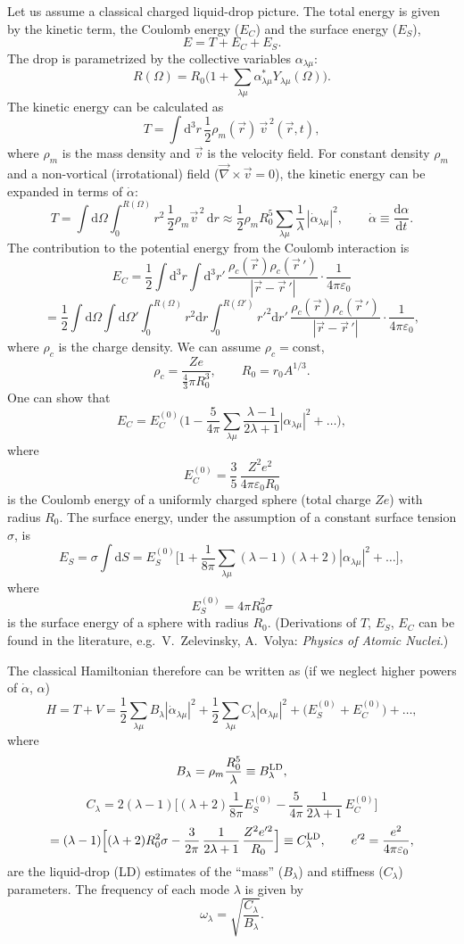 \documentclass[11pt,a4paper]{article}
\newcommand{\ud}{\mathrm{d}}
\begin{document}
Let us assume a classical charged liquid-drop picture. The total energy is given by the kinetic term, the Coulomb energy ($E_C$) and the surface energy ($E_S$),
\[
E=T+E_C+E_S .
\]
The drop is parametrized by the collective variables $\alpha_{\lambda\mu}$:
\[
R(\Omega)=R_0\Big(1+\sum_{\lambda\mu}\alpha^*_{\lambda\mu}Y_{\lambda\mu}(\Omega)\Big).
\]
The kinetic energy can be calculated as
\[
T=\int\ud^3r\,\frac12\rho_m(\vec r)\,\vec v^{\,2}(\vec r,t),
\]
where $\rho_m$ is the mass density and $\vec v$ is the velocity field. For constant density $\rho_m$ and a non-vortical (irrotational) field ($\vec\nabla\times\vec v=0$), the kinetic energy can be expanded in terms of $\dot\alpha$:
\[
T=\int\ud\Omega\int_0^{R(\Omega)}r^2\,\frac12\rho_m\vec v^{\,2}\,\ud r\approx\frac12\rho_mR_0^5\sum_{\lambda\mu}\frac1\lambda\,|\dot\alpha_{\lambda\mu}|^2,
\qquad \dot\alpha\equiv\frac{\ud\alpha}{\ud t}.
\]
The contribution to the potential energy from the Coulomb interaction is
\[
E_C=\frac12\int\ud^3r\int\ud^3r'\,\frac{\rho_c(\vec r)\rho_c(\vec r\,')}{|\vec r-\vec r\,'|}\cdot\frac{1}{4\pi\varepsilon_0}
\]
\[
=\frac12\int\ud\Omega\int\ud\Omega'\int_0^{R(\Omega)}r^2\ud r\int_0^{R(\Omega')}r'^2\ud r'\,\frac{\rho_c(\vec r)\rho_c(\vec r\,')}{|\vec r-\vec r\,'|}\cdot\frac{1}{4\pi\varepsilon_0},
\]
where $\rho_c$ is the charge density. We can assume $\rho_c=\text{const}$,
\[
\rho_c=\frac{Ze}{\frac43\pi R_0^3},\qquad R_0=r_0A^{1/3}.
\]
One can show that
\[
E_C=E_C^{(0)}\Big(1-\frac{5}{4\pi}\sum_{\lambda\mu}\frac{\lambda-1}{2\lambda+1}|\alpha_{\lambda\mu}|^2+\dots\Big),
\]
where
\[
E_C^{(0)}=\frac35\,\frac{Z^2e^2}{4\pi\varepsilon_0R_0}
\]
is the Coulomb energy of a uniformly charged sphere (total charge $Ze$) with radius $R_0$.
The surface energy, under the assumption of a constant surface tension $\sigma$, is
\[
E_S=\sigma\int\ud S=E_S^{(0)}\Big[1+\frac{1}{8\pi}\sum_{\lambda\mu}(\lambda-1)(\lambda+2)|\alpha_{\lambda\mu}|^2+\dots\Big],
\]
where
\[
E_S^{(0)}=4\pi R_0^2\sigma
\]
is the surface energy of a sphere with radius $R_0$. (Derivations of $T$, $E_S$, $E_C$ can be found in the literature, e.g.\ V.~Zelevinsky, A.~Volya: \emph{Physics of Atomic Nuclei}.)

The classical Hamiltonian therefore can be written as (if we neglect higher powers of $\dot\alpha$, $\alpha$)
\[
H=T+V=\frac12\sum_{\lambda\mu}B_\lambda|\dot\alpha_{\lambda\mu}|^2+\frac12\sum_{\lambda\mu}C_\lambda|\alpha_{\lambda\mu}|^2+\big(E_S^{(0)}+E_C^{(0)}\big)+\dots,
\]
where
\[
B_\lambda=\rho_m\frac{R_0^5}{\lambda}\equiv B_\lambda^{\rm LD},
\]
\[
C_\lambda=2(\lambda-1)\Big[(\lambda+2)\frac{1}{8\pi}E_S^{(0)}-\frac{5}{4\pi}\,\frac{1}{2\lambda+1}\,E_C^{(0)}\Big]
\]
\[
=(\lambda-1)\Big[(\lambda+2)R_0^2\sigma-\frac{3}{2\pi}\,\frac{1}{2\lambda+1}\,\frac{Z^2e'^2}{R_0}\Big]\equiv C_\lambda^{\rm LD},
\qquad e'^2=\frac{e^2}{4\pi\varepsilon_0},
\]
are the liquid-drop (LD) estimates of the ``mass'' ($B_\lambda$) and stiffness ($C_\lambda$) parameters.
The frequency of each mode $\lambda$ is given by
\[
\omega_\lambda=\sqrt{\frac{C_\lambda}{B_\lambda}} .
\]
\end{document}
